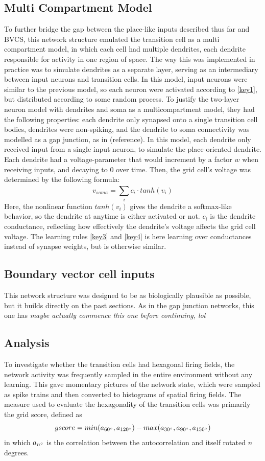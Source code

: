 \documentclass{article}
\begin{document}
    \subsection{Multi Compartment Model}
    To further bridge the gap between the place-like inputs described thus far and BVCS, this network structure emulated the transition cell as a multi compartment model, in which each cell had multiple dendrites, each dendrite responsible for activity in one region of space. The way this was implemented in practice was to simulate dendrites as a separate layer, serving as an intermediary between input neurons and transition cells. In this model, input neurons were similar to the previous model, so each neuron were activated according to \ref*{key1}, but distributed according to some random process. To justify the two-layer neuron model with dendrites and soma as a multicompartment model, they had the following properties: each dendrite only synapsed onto a single transition cell bodies, dendrites were non-spiking, and the dendrite to soma connectivity was modelled as a gap junction, as in (reference). In this model, each dendrite only received input from a single input neuron, to simulate the place-oriented dendrite. Each dendrite had a voltage-parameter that would increment by a factor \(w\) when receiving inputs, and decaying to 0 over time. Then, the grid cell's voltage was determined by the following formula: \[ v_{soma} = \sum_{i}^{} c_i \cdot tanh(v_i)\] Here, the nonlinear function \(tanh(v_i)\) gives the dendrite a softmax-like behavior, so the dendrite at anytime is either activated or not. \(c_i\) is the dendrite conductance, reflecting how effectively the dendrite's voltage affects the grid cell voltage. The learning rules \ref*{key3} and \ref*{key4} is here learning over conductances instead of synapse weights, but is otherwise similar.

    \subsection{Boundary vector cell inputs}
    This network structure was designed to be as biologically plausible as possible, but it builds directly on the past sections. As in the gap junction networks, this one has \textit{maybe actually commence this one before continuing, lol}

    \subsection{Analysis}
    To investigate whether the transition cells had hexagonal firing fields, the network activity was frequently sampled in the entire environment without any learning. This gave momentary pictures of the network state, which were sampled as spike trains and then converted to histograms of spatial firing fields. The measure used to evaluate the hexagonality of the transition cells was primarily the grid score, defined as \[gscore = min(a_{60\degree}, a_{120\degree}) - max(a_{30\degree}, a_{90\degree}, a_{150\degree})\] in which \(a_{n\degree}\) is the correlation between the autocorrelation and itself rotated \(n\) degrees.
\end{document}
